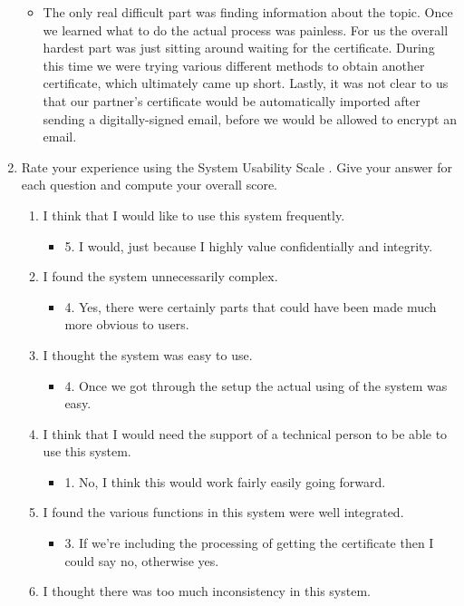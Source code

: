 \documentclass[11pt]{article}
\begin{document}
\begin{enumerate}
\begin{itemize}
\item The only real difficult part was finding information about the topic. Once we learned what to do the actual process was painless. For us the overall hardest part was just sitting around waiting for the certificate. During this time we were trying various different methods to obtain another certificate, which ultimately came up short. Lastly, it was not clear to us that our partner's certificate would be automatically imported after sending a digitally-signed email, before we would be allowed to encrypt an email.
\end{itemize}
\item Rate your experience using the System Usability Scale . Give your answer for each question and compute your overall score.
\begin{enumerate}
\item I think that I would like to use this system frequently.
\begin{itemize}
\item 5. I would, just because I highly value confidentially and integrity.
\end{itemize}
\item I found the system unnecessarily complex.
\begin{itemize}
\item 4. Yes, there were certainly parts that could have been made much more obvious to users.
\end{itemize}
\item I thought the system was easy to use.
\begin{itemize}
\item 4. Once we got through the setup the actual using of the system was easy.
\end{itemize}
\item I think that I would need the support of a technical person to be able to use this system.
\begin{itemize}
\item 1. No, I think this would work fairly easily going forward.
\end{itemize}
\item I found the various functions in this system were well integrated.
\begin{itemize}
\item 3. If we're including the processing of getting the certificate then I could say no, otherwise yes.
\end{itemize}
\item I thought there was too much inconsistency in this system.

\end{enumerate}
\end{enumerate}
\end{document}
